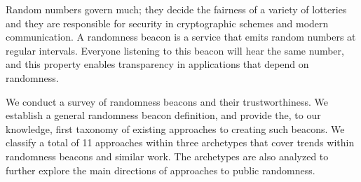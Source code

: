 Random numbers govern much;  they decide the fairness of a variety of lotteries and they are responsible for security in cryptographic schemes and modern communication.
A randomness beacon is a service that emits random numbers at regular intervals.
Everyone listening to this beacon will hear the same number, and this property enables transparency in applications that depend on randomness.%

We conduct a survey of randomness beacons and their trustworthiness.
We establish a general randomness beacon definition, and provide the, to our knowledge, first taxonomy of existing approaches to creating such beacons.
We classify a total of 11 approaches within three archetypes that cover trends within randomness beacons and similar work.
The archetypes are also analyzed to further explore the main directions of approaches to public randomness.
